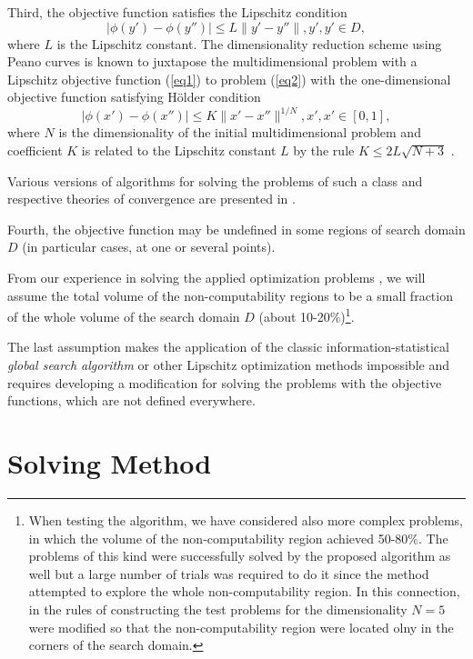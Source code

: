 \documentclass[runningheads]{llncs}
\begin{document}
Third, the objective function satisfies the Lipschitz condition
\begin{equation}\label{eq3} 
| \phi (y')-\phi (y'') | \leq L \| y'-y'' \|, y',y' \in D,
\end{equation}
where $L$ is the Lipschitz constant. The dimensionality reduction scheme using Peano curves is known to juxtapose the multidimensional problem with a Lipschitz objective function (\ref{eq1}) to problem (\ref{eq2}) with the one-dimensional objective function satisfying H{\"o}lder condition
\begin{equation}\label{eq4} 
| \phi (x')-\phi (x'') | \leq K \| x'-x'' \| ^{1/N}, x',x' \in [0,1],
\end{equation}
where $N$ is the dimensionality of the initial multidimensional problem and coefficient $K$ is related to the Lipschitz constant $L$ by the rule $K \leq 2L\sqrt {N+3}$ \cite{Strongin2000}.

Various versions of algorithms for solving the problems of such a class and respective theories of convergence are presented in \cite{Sergeyev2013,Strongin2000}.

Fourth, the objective function may be undefined in some regions of search domain $D$ (in particular cases, at one or several points).

From our experience in solving the applied optimization problems \cite{Barkalov2022,Gubaydullin2022}, we will assume the total volume of the non-computability regions to be a small fraction of the whole volume of the search domain $D$ (about 10-20\%)\footnote{When testing the algorithm, we have considered also more complex problems, in which the volume of the non-computability region achieved 50-80\%. The problems of this kind were successfully solved by the proposed algorithm as well but a large number of trials was required to do it since the method attempted to explore the whole non-computability region. In this connection, in the rules of constructing the test problems for the dimensionality $N=5$ were modified so that the non-computability region were located olny in the corners of the search domain.}.

The last assumption makes the application of the classic information-statistical \textit{global search algorithm} \cite{Strongin2000} or other Lipschitz optimization methods \cite{Sergeyev2017} impossible and requires developing a modification for solving the problems with the objective functions, which are not defined everywhere.

\section{Solving Method}
\end{document}
